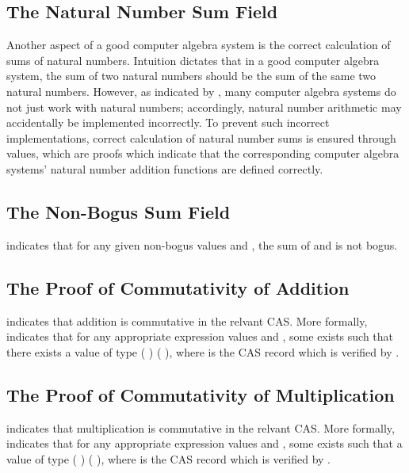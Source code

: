 \documentclass{report}
\begin{document}
\subsection{The Natural Number Sum Field}
Another aspect of a good computer algebra system is the correct calculation of sums of natural numbers.  Intuition dictates that in a good computer algebra system, the sum of two natural numbers should be the sum of the same two natural numbers.  However, as indicated by , many computer algebra systems do not just work with natural numbers; accordingly, natural number arithmetic may accidentally be implemented incorrectly.  To prevent such incorrect implementations, correct calculation of natural number sums is ensured through  values, which are proofs which indicate that the corresponding computer algebra systems' natural number addition functions are defined correctly.

\subsection{The Non-Bogus Sum Field}
 indicates that for any given non-bogus values  and , the sum of  and  is not bogus.

\subsection{The Proof of Commutativity of Addition}
 indicates that addition is commutative in the relvant CAS.  More formally,   indicates that for any appropriate expression values  and , some  exists such that there exists a value of type   \AgdaSymbol(   \AgdaSymbol) \AgdaSymbol(   \AgdaSymbol), where  is the CAS record which is verified by .

\subsection{The Proof of Commutativity of Multiplication}
 indicates that multiplication is commutative in the relvant CAS.  More formally,   indicates that for any appropriate expression values  and , some  exists such that a value of type   \AgdaSymbol(   \AgdaSymbol) \AgdaSymbol(   \AgdaSymbol), where  is the CAS record which is verified by .
\end{document}
